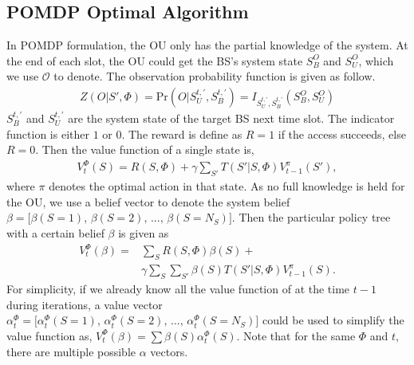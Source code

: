 \documentclass[conference]{IEEEtran}
\begin{document}
\subsection{POMDP Optimal Algorithm}
In POMDP formulation, the OU only has the partial knowledge of the system.
At the end of each slot, the OU could get the BS's system state \(S_B^O\) and \(S_U^O\),
which we use \(\mathcal{O}\) to denote.
The observation probability function is given as follow.
\begin{align}
	Z\left(O|S',\Phi\right) = \mbox{Pr}\left(O|S_U^{t,'}, S_B^{t,'}\right) =
	I_{S_U^{t,'},S_B^{t,'}}\left(S_B^O, S_U^O\right)
\end{align}
\(S_B^{t,'}\) and \(S_U^{t,'}\) are the system state of the target BS next time slot.
The indicator function is either \(1\) or \(0\).
The reward is define as \(R = 1\) if the access succeeds, else \(R= 0\).
Then the value function of a single state is,
\begin{equation}
\begin{aligned}
	V_t^\Phi\left(S\right) = R\left(S,\Phi\right) +\gamma\sum\limits_{S'}T\left(S'|S,\Phi\right)V_{t-1}^\pi\left(S'\right),
\end{aligned}%
\end{equation}
where \(\pi\) denotes the optimal action in that state.
As no full knowledge is held for the OU, we use a belief vector to denote the system belief
\(\beta = \lbrack \beta\left(S = 1\right),\,\beta\left(S = 2\right),\,...,\,\beta\left(S = N_S\right)\rbrack\).	
Then the particular policy tree with a certain belief \(\beta\) is given as
\begin{equation}
\begin{aligned}
	V_t^\Phi\left(\beta\right) = & \sum\limits_{S}R\left(S,\Phi\right)\beta\left(S\right) +\\
	&	\gamma\sum\limits_{S}\sum\limits_{S'}\beta\left(S\right)T\left(S'|S,\Phi\right)V_{t-1}^\pi\left(S\right).
\end{aligned}
\end{equation}
For simplicity, if we already know all the value function of at the time \(t-1\) during iterations,
a value vector \(\alpha_t^\Phi = \lbrack \alpha_t^\Phi\left(S = 1\right),\,
\alpha_t^\Phi\left(S = 2\right),\,...,\,\alpha_t^\Phi\left(S = N_S\right)\rbrack\)
could be used to simplify the value function as,
\(V_t^\Phi\left(\beta\right) = \sum\beta\left(S\right)\alpha_t^\Phi\left(S\right)\).
Note that for the same \(\Phi\) and \(t\), there are multiple possible \(\alpha\) vectors.
\end{document}
